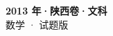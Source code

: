 \documentclass[zihao=-4, a4paper]{ctexart}
\begin{document}
\begin{center}
  {\Large\bfseries 2013 年·陕西卷·文科}\\[4pt]
  {\large 数学 · 试题版}
\end{center}
\medskip
{}

\end{document}
